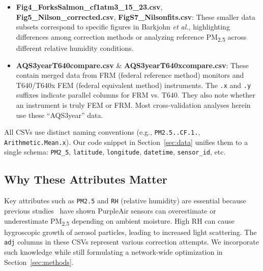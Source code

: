 \documentclass[12pt]{article}                                %
\begin{document}
\begin{itemize}
\item \textbf{Fig4\_ForksSalmon\_cf1atm3\_15\_23.csv}, \textbf{Fig5\_Nilson\_corrected.csv}, 
    \textbf{FigS7\_Nilsonfits.csv}:  
    These smaller data subsets correspond to specific figures in Barkjohn \emph{et al.}, 
    highlighting differences among correction methods or analyzing reference 
    PM\textsubscript{2.5} across different relative humidity conditions.

\item \textbf{AQS3yearT640compare.csv} \& \textbf{AQS3yearT640xcompare.csv}:  
    These contain merged data from FRM (federal reference method) monitors and T640/T640x FEM 
    (federal equivalent method) instruments. The \texttt{.x} and \texttt{.y} suffixes indicate 
    parallel columns for FRM vs. T640. They also note whether an instrument is truly FEM or FRM. 
    Most cross-validation analyses herein use these “AQS3year” data.
\end{itemize}

All CSVs use distinct naming conventions (e.g., \texttt{PM2.5..CF.1.}, \texttt{Arithmetic.Mean.x}). 
Our code snippet in Section~\ref{sec:data} unifies them to a single schema: \texttt{PM2\_5}, 
\texttt{latitude}, \texttt{longitude}, \texttt{datetime}, \texttt{sensor\_id}, etc.

\subsection{Why These Attributes Matter}    %
Key attributes such as \texttt{PM2.5} and \texttt{RH} (relative humidity) are essential because 
previous studies~\cite{Barkjohn2022Sensors} have shown PurpleAir sensors can overestimate or 
underestimate PM\textsubscript{2.5} depending on ambient moisture. High RH can cause hygroscopic 
growth of aerosol particles, leading to increased light scattering. The \texttt{adj} columns in 
these CSVs represent various correction attempts. We incorporate such knowledge while still 
formulating a network-wide optimization in Section~\ref{sec:methods}.
\end{document}
